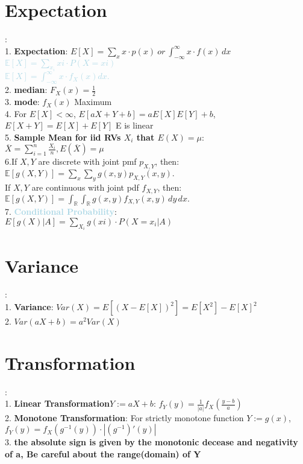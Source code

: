 \documentclass[twocolumn]{article}
\newcommand{\method}[1]{\textbf{\textcolor{lightblue}{#1}}}
\newcommand{\sectionspace}{\vspace*{1em}}
\newcommand{\discrete}[1]{\textbf{\textcolor{lightblue}{#1}}}
\newcommand{\continuous}[1]{\textbf{\textcolor{lightblue}{#1}}}
\begin{document}
\sectionspace

\section{Expectation} 
:\\
1. \textbf{Expectation}: $E[X] = \sum_{x} x \cdot p(x) \ or \ \int_{-\infty}^{\infty} x \cdot f(x) \, dx$\\
\discrete{ $\mathbb{E}[X] = \sum_{x_i} xi \cdot P(X = xi )$}\\
\continuous{ $\mathbb{E}[X]= \int_{-\infty}^{\infty}  x \cdot f_{X}(x) dx.$}\\
2. \textbf{median}:  $F_{X}(x) = \frac{1}{2}$\\
3. \textbf{mode}:	 $f_{X}(x)$ Maximum\\
4. For $E[X] < \infty$, $E[aX+Y + b] = aE[X] E[Y]+b$, $E[X + Y] = E[X] + E [Y]$ E is linear\\
5. \textbf{Sample Mean for iid RVs $X_i$ that $E(X) = \mu$}:\\
$\overline{X} =   \sum_{i = 1}^{n} \frac{X_i}{n}, E(\overline{X}) = \mu$\\
6.If \( X, Y \) are discrete with joint pmf \( p_{X, Y} \), then:\\
$\mathbb{E}[g(X, Y)] = \sum_x \sum_y g(x, y) p_{X, Y}(x, y).$\\
If \( X, Y \) are continuous with joint pdf \( f_{X, Y} \), then:\\
$\mathbb{E}[g(X, Y)] = \int_{\mathbb{R}} \int_{\mathbb{R}} g(x, y) f_{X, Y}(x, y) \, dy \, dx.$\\
7. \method{Conditional Probability}:\\
$E[g(X)|A]=\sum_{X_i} g(xi)·P(X = x_i |A)$\\


\sectionspace

\section{Variance}
:\\
1. \textbf{Variance}: $Var(X) = E[(X - E[X])^2] = E[X^2] - E[X]^2$\\
2. $Var(aX + b) = a^2Var(X)$

\sectionspace

\section{Transformation}
:\\
1. \textbf{Linear Transformation}$Y := aX + b$:  $f_Y(y) = \frac{1}{|a|} f_X\left(\frac{y - b}{a}\right)$\\
2. \textbf{Monotone Transformation}: For strictly monotone function  $Y := g(x)$, $f_Y(y) = f_X\left(g^{-1}(y)\right) \cdot \left| \left(g^{-1}\right)'(y) \right|$\\
3. \textbf{the absolute sign is given by the monotonic decease and negativity of a, Be careful about the range(domain) of Y}
\end{document}
